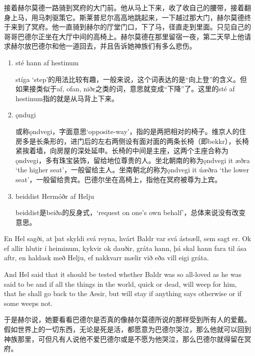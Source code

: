 \begin{translation*}{}
  接着赫尔莫德一路骑到冥府的大门前。他从马上下来，收了收自己的腰带，接着翻身上马，用马刺驱策它。斯莱普尼尔高高地跳起来，一下越过那大门，赫尔莫德终于来到了冥府。他一直骑到赫尔的厅堂门口，下了马，径直走到里面。只见自己的哥哥巴德尔正坐在大厅中间的高椅上。赫尔莫德在那里留宿一夜，第二天早上他请求赫尔放巴德尔和他一道回去，并且告诉她神族们有多么悲伤。
\end{translation*}
\begin{grammar*}{}
  \begin{enumerate}[leftmargin=*]
    \item sté hann af hestinum

          stíga `step'的用法比较有趣，一般来说，这个词表达的是“向上登”的含义。但如果接类似于af, ofan, niðr之类的词，意思就变成“下降”了。这里的sté af hestinum指的就是从马背上下来。

    \item ǫndugi

          或称ǫndvegi，字面意思`opposite-way'，指的是两把相对的椅子。维京人的住房多是长条形的，进门后的左右两侧设有面对面的两条长椅（即bekkr），长椅紧挨着墙，向房屋的深处延申。长椅的中间是主座，这两个主座合称为ǫndvegi，多有珠宝装饰，留给地位尊贵的人。坐北朝南的称为ǫndvegi it æðra `the higher seat'，一般留给主人。坐南朝北的称为ǫndvegi it úæðra `the lower seat'，一般留给贵宾。巴德尔坐在高椅上，指他在冥府被尊为上宾。

    \item beiddist Hermóðr af Helju

          beiddist是beiða的反身式，`request on one's own behalf'，总体来说没有改变意思。
  \end{enumerate}
\end{grammar*}
\begin{paracol}{2}
  En Hel sagði, at þat skyldi svá reyna, hvárt Baldr var svá ástsæll, sem sagt er. Ok ef allir hlutir í heiminum, kykvir ok dauðir, gráta hann, þá skal hann fara til ása aftr, en haldask með Helju, ef nakkvarr mælir við eða vill eigi gráta.

  \switchcolumn

  And Hel said that it should be tested whether Baldr was so all-loved as he was said to be and if all the things in the world, quick or dead, will weep for him, that he shall go back to the Aesir, but will stay if anything says otherwise or if some weeps not.
\end{paracol}
\begin{translation*}{}
  于是赫尔说，她要看看巴德尔是否真的像赫尔莫德所说的那样受到所有人的爱戴。假如世界上的一切东西，无论是死是活，都愿意为巴德尔哭泣，那么他就可以回到神族那里，可但凡有人说他不爱巴德尔或是不愿为他哭泣，那么巴德尔就得留在冥府。
\end{translation*}
